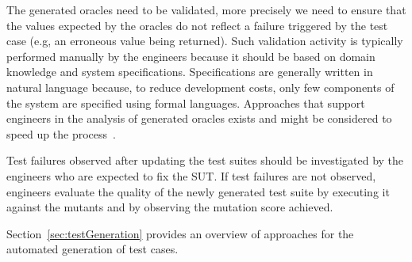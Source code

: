 The generated oracles need to be validated, more precisely we need to ensure that the values expected by the oracles do not reflect a failure triggered by the test case (e.g, an erroneous value being returned). Such validation activity is typically performed manually by the engineers because it should be based on domain knowledge and system specifications. Specifications are generally written in natural language because, to reduce development costs, only few components of the system are specified using formal languages.
Approaches that support engineers in the analysis of generated oracles exists and might be considered to speed up the process~\cite{PastoreICSE2015}.

Test failures observed after updating the test suites should be investigated by the engineers who are expected to fix the SUT.
If test failures are not observed, engineers evaluate the quality of the newly generated test suite by executing it against the mutants and by observing the mutation score achieved. 

Section~\ref{sec:testGeneration} provides an overview of approaches for the automated generation of test cases.






